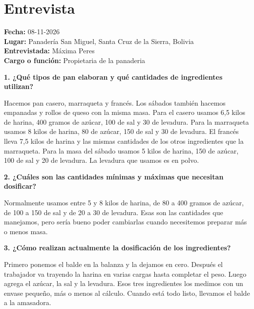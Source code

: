 
\chapter{Entrevista}
\label{ap:entrevista_requerimientos}

\noindent
\textbf{Fecha:} 08-11-2026\\
\textbf{Lugar:} Panadería San Miguel, Santa Cruz de la Sierra, Bolivia\\
\textbf{Entrevistada:} Máxima Peres\\
\textbf{Cargo o función:} Propietaria de la panaderia \\

\par\medskip

\noindent
\textbf{1. ¿Qué tipos de pan elaboran y qué cantidades de ingredientes utilizan?}

\par\medskip
Hacemos pan casero, marraqueta y francés. Los sábados también hacemos empanadas y rollos de queso con la misma masa. Para el casero usamos 6,5 kilos de harina, 400 gramos de azúcar, 100 de sal y 30 de levadura. Para la marraqueta usamos 8 kilos de harina, 80 de azúcar, 150 de sal y 30 de levadura. El francés lleva 7,5 kilos de harina y las mismas cantidades de los otros ingredientes que la marraqueta. Para la masa del sábado usamos 5 kilos de harina, 150 de azúcar, 100 de sal y 20 de levadura. La levadura que usamos es en polvo.

\par\medskip

\noindent
\textbf{2. ¿Cuáles son las cantidades mínimas y máximas que necesitan dosificar?}

\par\medskip
Normalmente usamos entre 5 y 8 kilos de harina, de 80 a 400 gramos de azúcar, de 100 a 150 de sal y de 20 a 30 de levadura. Esas son las cantidades que manejamos, pero sería bueno poder cambiarlas cuando necesitemos preparar más o menos masa.

\par\medskip

\noindent
\textbf{3. ¿Cómo realizan actualmente la dosificación de los ingredientes?}

\par\medskip
Primero ponemos el balde en la balanza y la dejamos en cero. Después el trabajador va trayendo la harina en varias cargas hasta completar el peso. Luego agrega el azúcar, la sal y la levadura. Esos tres ingredientes los medimos con un envase pequeño, más o menos al cálculo. Cuando está todo listo, llevamos el balde a la amasadora.

